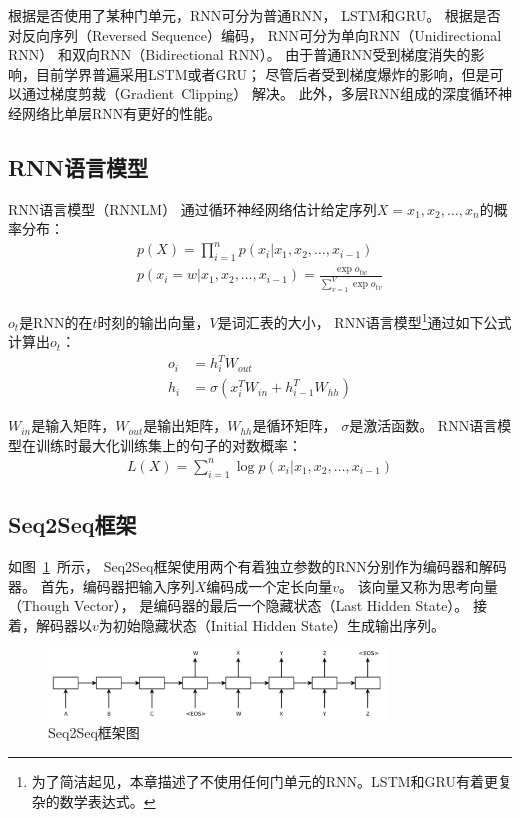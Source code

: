根据是否使用了某种门单元，RNN可分为普通RNN，
LSTM和GRU。
根据是否对反向序列（Reversed Sequence）编码，
RNN可分为单向RNN（Unidirectional RNN）
和双向RNN（Bidirectional RNN）。
由于普通RNN受到梯度消失的影响，目前学界普遍采用LSTM或者GRU；
尽管后者受到梯度爆炸的影响，但是可以通过梯度剪裁（Gradient~Clipping）
解决。
此外，多层RNN组成的深度循环神经网络比单层RNN有更好的性能。

\subsection{RNN语言模型}\label{subsec:RNNLM}
RNN语言模型（RNNLM）
通过循环神经网络估计给定序列$X=x_1, x_2, \dots, x_n$的概率分布：
\begin{align}
    p(X) = \prod_{i=1}^{n} p(x_i|x_1, x_2, \dots, x_{i-1})
    \label{eqn:language_model_probability} \\
    p(x_i = w|x_1, x_2, \dots, x_{i-1}) = \frac{\exp{o_{tw}}}{\sum_{v=1}^V \exp{o_{tv}}}
    \label{eqn:language_model_estimation}
\end{align}

$o_t$是RNN的在$t$时刻的输出向量，$V$是词汇表的大小，
RNN语言模型\footnote{为了简洁起见，本章描述了不使用任何门单元的RNN。LSTM和GRU有着更复杂的数学表达式。}通过如下公式计算出$o_t$：
\begin{align}
    o_i &= h_i^T W_{out} \\
    h_i &= \sigma \left( x_i^T W_{in} + h_{i-1}^T W_{hh} \right)
\end{align}

$W_{in}$是输入矩阵，$W_{out}$是输出矩阵，$W_{hh}$是循环矩阵，
$\sigma$是激活函数。
RNN语言模型在训练时最大化训练集上的句子的对数概率：
\begin{align}
    \mathit{L(X)} = \sum_{i=1}^n \log p(x_i|x_1, x_2, \dots, x_{i-1})
\end{align}


\subsection{Seq2Seq框架}\label{subsec:Seq2Seq}
如图~\ref{fig:Seq2Seq}~所示，
Seq2Seq框架使用两个有着独立参数的RNN分别作为编码器和解码器。
首先，编码器把输入序列$X$编码成一个定长向量$v$。
该向量又称为思考向量（Though Vector），
是编码器的最后一个隐藏状态（Last Hidden State）。
接着，解码器以$v$为初始隐藏状态（Initial Hidden State）生成输出序列。
\begin{figure}[H]
    \centering
    \includegraphics[width=0.8\textwidth]{figure/Seq2Seq.png}
    \caption{Seq2Seq框架图}
    \label{fig:Seq2Seq}
\end{figure}

